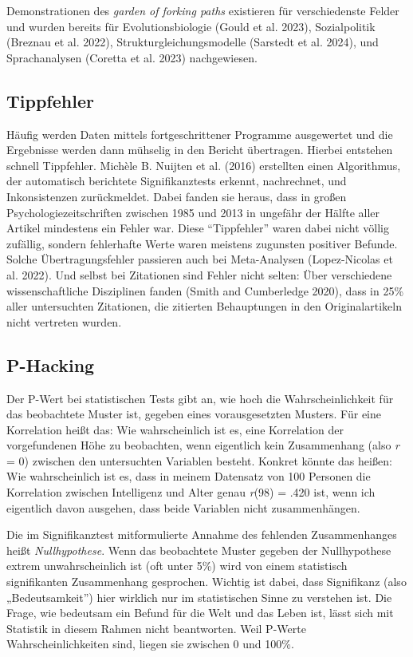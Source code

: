 \documentclass[
  letterpaper,
  DIV=11,
  numbers=noendperiod]{scrreprt}
\begin{document}
Demonstrationen des \emph{garden of forking paths} existieren für
verschiedenste Felder und wurden bereits für Evolutionsbiologie (Gould
et al. 2023), Sozialpolitik (Breznau et al. 2022),
Strukturgleichungsmodelle (Sarstedt et al. 2024), und Sprachanalysen
(Coretta et al. 2023) nachgewiesen.

\subsection{Tippfehler}\label{tippfehler}

Häufig werden Daten mittels fortgeschrittener Programme ausgewertet und
die Ergebnisse werden dann mühselig in den Bericht übertragen. Hierbei
entstehen schnell Tippfehler. Michèle B. Nuijten et al. (2016)
erstellten einen Algorithmus, der automatisch berichtete
Signifikanztests erkennt, nachrechnet, und Inkonsistenzen zurückmeldet.
Dabei fanden sie heraus, dass in großen Psychologiezeitschriften
zwischen 1985 und 2013 in ungefähr der Hälfte aller Artikel mindestens
ein Fehler war. Diese ``Tippfehler'' waren dabei nicht völlig zufällig,
sondern fehlerhafte Werte waren meistens zugunsten positiver Befunde.
Solche Übertragungsfehler passieren auch bei Meta-Analysen
(Lopez-Nicolas et al. 2022). Und selbst bei Zitationen sind Fehler nicht
selten: Über verschiedene wissenschaftliche Disziplinen fanden (Smith
and Cumberledge 2020), dass in 25\% aller untersuchten Zitationen, die
zitierten Behauptungen in den Originalartikeln nicht vertreten wurden.

\subsection{P-Hacking}\label{p-hacking}

Der P-Wert bei statistischen Tests gibt an, wie hoch die
Wahrscheinlichkeit für das beobachtete Muster ist, gegeben eines
vorausgesetzten Musters. Für eine Korrelation heißt das: Wie
wahrscheinlich ist es, eine Korrelation der vorgefundenen Höhe zu
beobachten, wenn eigentlich kein Zusammenhang (also \emph{r} = 0)
zwischen den untersuchten Variablen besteht. Konkret könnte das heißen:
Wie wahrscheinlich ist es, dass in meinem Datensatz von 100 Personen die
Korrelation zwischen Intelligenz und Alter genau \emph{r}(98) = .420
ist, wenn ich eigentlich davon ausgehen, dass beide Variablen nicht
zusammenhängen.

Die im Signifikanztest mitformulierte Annahme des fehlenden
Zusammenhanges heißt \emph{Nullhypothese}. Wenn das beobachtete Muster
gegeben der Nullhypothese extrem unwahrscheinlich ist (oft unter 5\%)
wird von einem statistisch signifikanten Zusammenhang gesprochen.
Wichtig ist dabei, dass Signifikanz (also „Bedeutsamkeit'') hier
wirklich nur im statistischen Sinne zu verstehen ist. Die Frage, wie
bedeutsam ein Befund für die Welt und das Leben ist, lässt sich mit
Statistik in diesem Rahmen nicht beantworten. Weil P-Werte
Wahrscheinlichkeiten sind, liegen sie zwischen 0 und 100\%.
\end{document}

